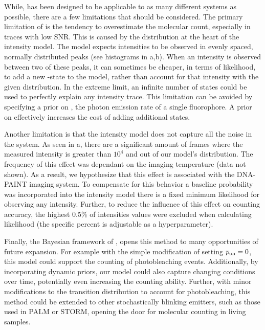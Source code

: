 While, \ours has been designed to be applicable to as many different systems as possible, 
there are a few limitations that should be considered.
    The primary limitation of \ours is the tendency to overestimate the molecular count, 
    especially in traces with low SNR. 
    This is caused by the distribution at the heart of the intensity model. 
    The model expects intensities to be observed in evenly spaced, normally distributed 
    peaks (see histograms in a,b).
    When an intensity is observed between two of these peaks, it can sometimes be cheaper, 
    in terms of likelihood, to add a new \z{}-state to the model,
    rather than account for that intensity with the given distribution.
    In the extreme limit, an infinite number of states could be used to perfectly explain any intensity trace.
    This limitation can be avoided by specifying a prior on \re, the photon emission rate of a single fluorophore. 
    A prior on \re effectively increases the cost of adding additional states.

Another limitation is that the intensity model does not capture all the noise in the system.
    As seen in a, there are a significant amount of frames where the 
    measured intensity is greater than $10^4$ and out of our model's distribution.
    The frequency of this effect was dependant on the imaging temperature (data not shown).
    As a result, we hypothesize that this effect is associated with the DNA-PAINT imaging system.
    To compensate for this behavior a baseline probability was incorporated into the intensity model 
    \ie there is a fixed minimum likelihood for observing any intensity.
    Further, to reduce the influence of this effect on counting accuracy, the highest 0.5\% of 
    intensities values were excluded when calculating likelihood (the specific percent is adjustable as a hyperparameter).

Finally, the Bayesian framework of \ours, opens this method to many opportunities of future expansion.
    For example with the simple modification of setting $p_\text{on}=0$, this 
    model could support the counting of photobleaching events. 
    Additionally, by incorporating dynamic priors, our model could 
    also capture changing conditions over time, potentially even increasing the counting ability.
    Further, with minor modifications to the transition distribution to account for photobleaching,
    this method could be extended to other stochastically blinking emitters, 
    such as those used in PALM or STORM, opening the door for molecular counting in living samples.
